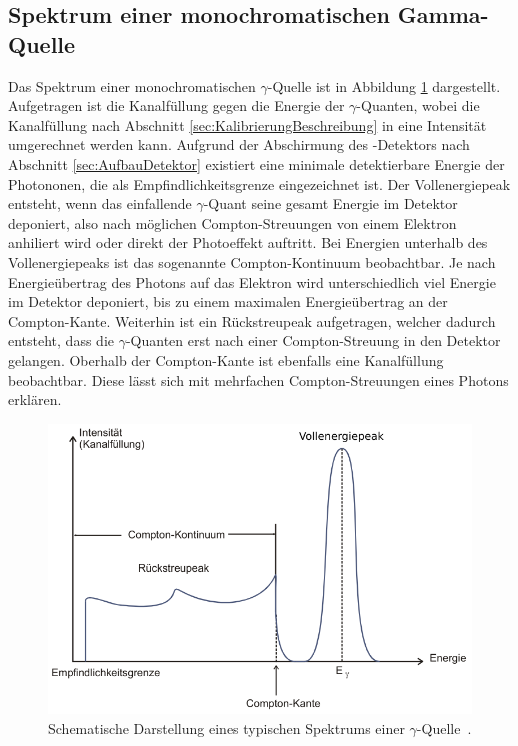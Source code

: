 \subsection{Spektrum einer monochromatischen Gamma-Quelle}
\label{sec:TypischeQuelle}

Das Spektrum einer monochromatischen $\gamma$-Quelle ist in Abbildung \ref{fig:typisches-Spektrum}
dargestellt. Aufgetragen ist die Kanalfüllung gegen die Energie der $\gamma$-Quanten, wobei
die Kanalfüllung nach Abschnitt \ref{sec:KalibrierungBeschreibung} in eine Intensität umgerechnet werden kann.
Aufgrund der Abschirmung des -Detektors nach Abschnitt \ref{sec:AufbauDetektor} existiert eine
minimale detektierbare Energie der Photononen, die als Empfindlichkeitsgrenze eingezeichnet ist.
Der Vollenergiepeak entsteht, wenn das einfallende $\gamma$-Quant seine gesamt Energie im Detektor
deponiert, also nach möglichen Compton-Streuungen von einem Elektron anhiliert wird oder direkt der
Photoeffekt auftritt.
Bei Energien unterhalb des Vollenergiepeaks ist das sogenannte Compton-Kontinuum beobachtbar. Je nach
Energieübertrag des Photons auf das Elektron wird unterschiedlich viel Energie im Detektor deponiert,
bis zu einem maximalen Energieübertrag an der Compton-Kante.
Weiterhin ist ein Rückstreupeak aufgetragen, welcher dadurch entsteht, dass die $\gamma$-Quanten erst
nach einer Compton-Streuung in den Detektor gelangen.
Oberhalb der Compton-Kante ist ebenfalls eine Kanalfüllung beobachtbar. Diese lässt sich mit mehrfachen
Compton-Streuungen eines Photons erklären.

\begin{figure}
	\centering
	\includegraphics[width=.8\textwidth]{images/typisches-Spektrum.pdf}
	\caption{Schematische Darstellung eines typischen Spektrums einer $\gamma$-Quelle~\cite[23]{anleitung}.}
	\label{fig:typisches-Spektrum}
\end{figure}

